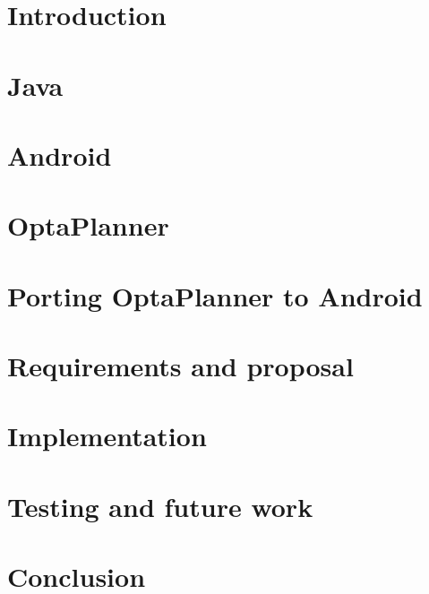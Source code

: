 \chapter{Introduction}\label{IntroductionChapter}


\chapter{Java}\label{JavaChapter}


\chapter{Android}\label{AndroidChapter}


\chapter{OptaPlanner}\label{OptaPlannerChapter}


\chapter{Porting OptaPlanner to Android}\label{PortingChapter}


\chapter{Requirements and proposal}\label{ProposalChapter}


\chapter{Implementation}\label{ImplementationChapter}


\chapter{Testing and future work}\label{TestingChapter}


\chapter{Conclusion}\label{ConclusionChapter}

